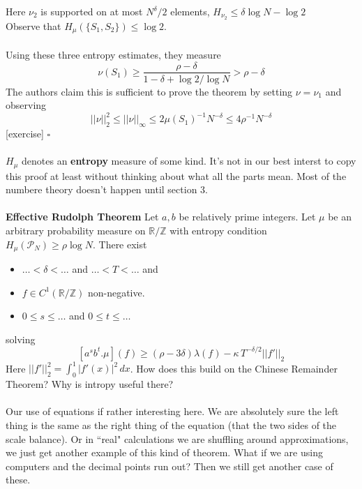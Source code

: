 \documentclass[12pt]{article}
\begin{document}
{Here $ \nu_2$ is supported on at most $N^\delta/2$ elements, $ H_{\nu_2} \leq \delta \log N - \log 2$ \\ 
Observe that $H_\mu(\{S_1, S_2\}) \leq \log 2 $. \\ \\
Using these three entropy estimates, they measure  
$$ \nu(S_1) \geq \frac{ \rho - \delta }{ 1 - \delta + \log 2 / \log N } > \rho - \delta $$
The authors claim this is sufficient to prove the theorem by setting $\nu = \nu_1$ and observing
$$ ||\nu||_2^2 \leq ||\nu||_\infty \leq 2 \mu (S_1)^{-1} N^{-\delta} \leq 4\rho^{-1} N^{-\delta} $$
[exercise] \hfill $\square$ \\ \\
$H_\mu$ denotes an \textbf{entropy} measure of some kind.  It's not in our best interst to copy this proof at least without thinking about what all the parts mean.  Most of the numbere theory doesn't happen until section 3. \\ \\
\textbf{Effective Rudolph Theorem} Let $a, b$ be relatively prime integers.  Let $\mu$ be an arbitrary probability measure on $\mathbb{R}/\mathbb{Z}$ with entropy condition $H_\mu(\mathcal{P}_N) \geq \rho \log N $. There exist 
\begin{itemize}
	\item $\dots < \delta < \dots$ and $\dots < T < \dots$ and 
	\item $f \in C^1(\mathbb{R}/\mathbb{Z})$ non-negative. 
	\item $ 0 \leq s \leq \dots$ and $0 \leq t \leq \dots $  
\end{itemize}  
solving 
$$ [a^s b^t .\mu](f) \geq (\rho - 3 \delta) \lambda(f) - \kappa  \, T^{-\delta/2} ||f'||_2 $$
Here $||f'||_2^2 = \int_0^1 |f'(x)|^2 \, dx $. How does this build on the Chinese Remainder Theorem?  Why is intropy useful there? \\ \\
Our use of equations if rather interesting here.  We are absolutely sure the left thing is the same as the right thing of the equation (that the two sides of the scale balance).  Or in ``real" calculations we are shuffling around approximations, we just get another example of this kind of theorem.  What if we are  using computers and the decimal points run out?  Then we still get another case of these.  

\newpage

}
\end{document}
